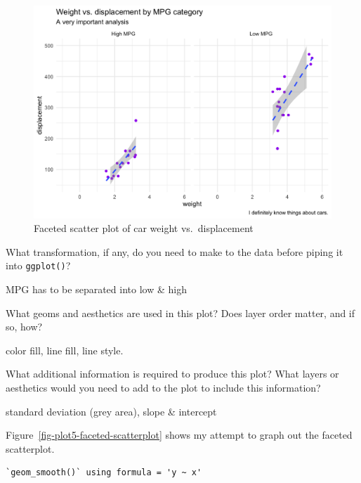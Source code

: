 \documentclass[
  man,
  floatsintext,
  longtable,
  nolmodern,
  notxfonts,
  notimes,
  colorlinks=true,linkcolor=blue,citecolor=blue,urlcolor=blue]{apa7}
\begin{document}
\begin{figure}[H]

\caption{Faceted scatter plot of car weight vs.~displacement}

{\centering \includegraphics{plots/plot5.png}

}

\end{figure}%

What transformation, if any, do you need to make to the data before
piping it into \texttt{ggplot()}?

MPG has to be separated into low \& high

What geoms and aesthetics are used in this plot? Does layer order
matter, and if so, how?

color fill, line fill, line style.

What additional information is required to produce this plot? What
layers or aesthetics would you need to add to the plot to include this
information?

standard deviation (grey area), slope \& intercept

Figure~\ref{fig-plot5-faceted-scatterplot} shows my attempt to graph out
the faceted scatterplot.

\begin{verbatim}
`geom_smooth()` using formula = 'y ~ x'
\end{verbatim}
\end{document}
